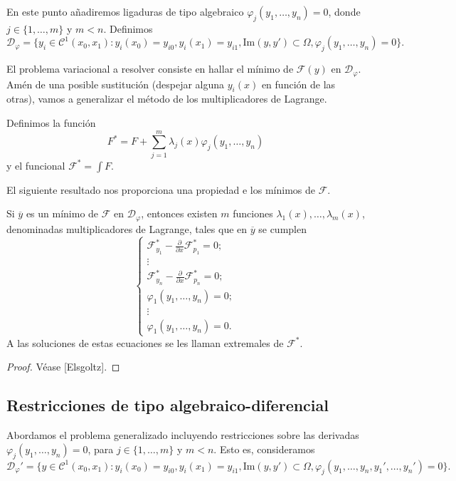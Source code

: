 \documentclass{article}
\begin{document}
En este punto añadiremos ligaduras de tipo algebraico $\varphi_j(y_1, \ldots, y_n) = 0$, donde
$j \in \{1, \ldots, m\}$ y $m < n$. Definimos
\[\mathcal{D}_\varphi = \{y_i \in \mathcal{C}^1(x_0, x_1): y_i(x_0) = y_{i0}, y_i(x_1) = y_{i1},
  \mathrm{Im}(y, y') \subset \Omega, \varphi_j(y_1, \ldots, y_n) = 0\}.\]

El problema variacional a resolver consiste en hallar el mínimo de $\mathcal{F}(y)$ en
$\mathcal{D}_\varphi$. Amén de una posible sustitución (despejar alguna $y_i(x)$ en función de las
otras), vamos a generalizar el método de los multiplicadores de Lagrange.

 Definimos la función
\[F^* = F + \sum_{j = 1}^m \lambda_j(x) \varphi_j(y_1, \ldots, y_n)\] y el funcional
$\mathcal{F}^* = \int F$.

El siguiente resultado nos proporciona una propiedad e los mínimos de $\mathcal{F}$.

\begin{thm}
  Si $\overline{y}$ es un mínimo de $\mathcal{F}$ en $\mathcal{D}_\varphi$, entonces existen $m$
  funciones $\lambda_1(x), \ldots, \lambda_m(x)$, denominadas multiplicadores de Lagrange, tales que
  en $\overline{y}$ se cumplen
  \[
    \begin{cases}
      \mathcal{F}_{y_1}^* - \frac{\partial}{\partial x} \mathcal{F}_{p_1}^* = 0; \\
      \vdots \\
      \mathcal{F}_{y_n}^* - \frac{\partial}{\partial x} \mathcal{F}_{p_n}^* = 0; \\
      \varphi_1(y_1, \dots, y_n) = 0; \\
      \vdots \\
      \varphi_1(y_1, \dots, y_n) = 0.
    \end{cases}
  \]
  A las soluciones de estas ecuaciones se les llaman extremales de $\mathcal{F}^*$.
\end{thm}
\begin{proof}
  Véase [Elsgoltz].
\end{proof}

\subsection{Restricciones de tipo algebraico-diferencial}

Abordamos el problema generalizado incluyendo restricciones sobre las derivadas
$\varphi_j(y_1, \ldots, y_n) = 0$, para $j \in \{1, \ldots, m\}$ y $m < n$. Esto es, consideramos
\[\mathcal{D}_\varphi' = \{y \in \mathcal{C}^1(x_0, x_1): y_i(x_0) = y_{i0}, y_i(x_1) = y_{i1},
  \mathrm{Im}(y, y') \subset \Omega, \varphi_j(y_1, \ldots, y_n, y_1', \ldots, y_n') = 0 \}.\]
\end{document}
